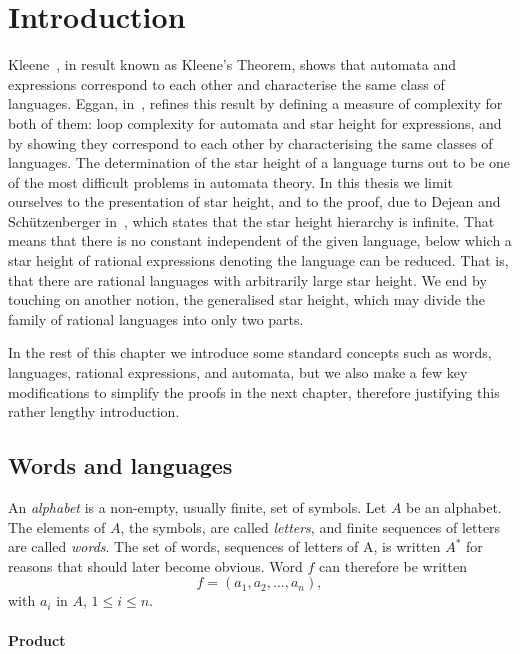 \chapter{Introduction}

Kleene~\cite{Kleene56}, in result known as Kleene’s Theorem, shows that automata and expressions correspond to each other and characterise the same class of languages. Eggan, in~\cite{Eggan63}, refines this result by defining a measure of complexity for both of them: loop complexity for automata and star height for expressions, and by showing they correspond to each other by characterising the same classes of languages. The determination of the star height of a language turns out to be one of the most difficult problems in automata theory. In this thesis we limit ourselves to the presentation of star height, and to the proof, due to Dejean and Schützenberger in~\cite{DejeanSchutzenberger66}, which states that the star height hierarchy is infinite. That means that there is no constant independent of the given language, below which a star height of rational expressions denoting the language can be reduced. That is, that there are rational languages with arbitrarily large star height. We end by touching on another notion, the generalised star height, which may divide the family of rational languages into only two parts.

In the rest of this chapter we introduce some standard concepts such as words, languages, rational expressions, and automata, but we also make a few key modifications to simplify the proofs in the next chapter, therefore justifying this rather lengthy introduction.

\section{Words and languages}

An \emph{alphabet} is a non-empty, usually finite, set of symbols. Let $A$ be an alphabet. The elements of $A$, the symbols, are called \emph{letters}, and finite sequences of letters are called \emph{words}. The set of words, sequences of letters of A, is written $A^*$ for reasons that should later become obvious. Word $f$ can therefore be written
\[
    f = (a_1, a_2, \dotsc, a_n),
\]
with $a_i$ in $A$, $1 \leq i \leq n$.

\subsubsection*{Product}

